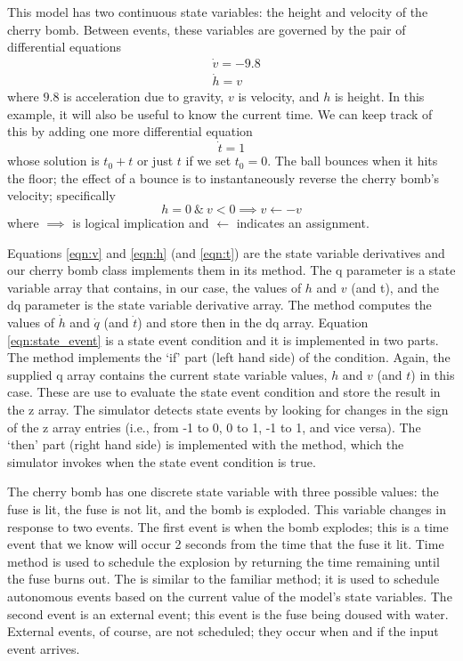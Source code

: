 This model has two continuous state variables: the height and velocity of the cherry bomb. Between events, these variables are governed by the pair of differential equations
\begin{align}
&\dot{v} = -9.8 \label{eqn:v} \\
&\dot{h} = v \label{eqn:h}
\end{align}
where $9.8$ is acceleration due to gravity, $v$ is velocity, and $h$ is height. In this example, it will also be useful to know the current time. We can keep track of this by adding one more differential equation
\begin{equation}
\dot{t} = 1 \label{eqn:t}
\end{equation}
whose solution is $t_0 + t$ or just $t$ if we set $t_0 = 0$.
The ball bounces when it hits the floor; the effect of a bounce is to instantaneously reverse the cherry bomb's velocity; specifically
\begin{equation}
h = 0 \ \& \ v < 0 \implies v \leftarrow -v \label{eqn:state_event}
\end{equation}
where $\implies$ is logical implication and $\leftarrow$ indicates an assignment. 

Equations \ref{eqn:v} and \ref{eqn:h} (and \ref{eqn:t}) are the state variable derivatives and our cherry bomb class implements them in its  method. The q parameter is a state variable array that contains, in our case, the values of $h$ and $v$ (and t), and the dq parameter is the state variable derivative array. The method computes the values of $\dot{h}$ and $\dot{q}$ (and $\dot{t}$) and store then in the dq array. Equation \ref{eqn:state_event} is a state event condition and it is implemented in two parts. The  method implements the `if' part (left hand side) of the condition. Again, the supplied q array contains the current state variable values, $h$ and $v$ (and $t$) in this case. These are use to evaluate the state event condition and store the result in the z array. The simulator detects state events by looking for changes in the sign of the z array entries (i.e., from -1 to 0, 0 to 1, -1 to 1, and vice versa). The `then' part (right hand side) is implemented with the  method, which the simulator invokes when the state event condition is true.

The cherry bomb has one discrete state variable with three possible values: the fuse is lit, the fuse is not lit, and the bomb is exploded. This variable changes in response to two events. The first event is when the bomb explodes; this is a time event that we know will occur 2 seconds from the time that the fuse it lit. Time  method is used to schedule the explosion by returning the time remaining until the fuse burns out. The  is similar to the familiar  method; it is used to schedule autonomous events based on the current value of the model's state variables. The second event is an external event; this event is the fuse being doused with water. External events, of course, are not scheduled; they occur when and if the input event arrives.


